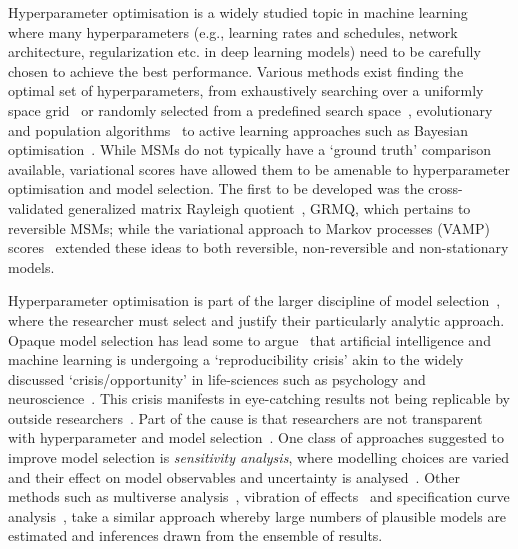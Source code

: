 \documentclass[journal=jacsat,manuscript=article]{achemso}
\begin{document}
Hyperparameter optimisation is a widely studied topic in machine learning~\cite{feurer2019hyperparameter, bergstra_jamesbergstra_random_2012, bergstra_making_2013, bergstraAlgorithmsHyperParameterOptimizationa} where many hyperparameters (e.g., learning rates and schedules, network architecture, regularization etc. in deep learning models) need to be carefully chosen to achieve the best performance. Various methods exist finding the optimal set of hyperparameters, from exhaustively searching over a uniformly space grid~\cite{c1997montgomery} or randomly selected from a predefined search space~\cite{bergstra_jamesbergstra_random_2012}, evolutionary and population algorithms~\cite{simon2013evolutionary, kennedyParticleSwarmOptimization1995, eberhart1998comparison, hansenCMAEvolutionStrategy2016} to active learning approaches such as Bayesian optimisation~\cite{hutterSequentialModelbasedOptimization2011, bergstraAlgorithmsHyperParameterOptimizationa, NIPS2012_4522, bergstraMakingScienceModel2013}.
While MSMs do not typically have a `ground truth' comparison available, variational scores have allowed them to be amenable to hyperparameter optimisation and model selection. The first to be developed was the cross-validated generalized matrix Rayleigh quotient~\cite{mcgibbonVariationalCrossvalidationSlow2015}, GRMQ, which pertains to reversible MSMs; while the variational approach to Markov processes (VAMP) scores~\cite{wuVariationalApproachLearning2020c,scherer_variational_2019} extended these ideas to both reversible, non-reversible and non-stationary models. 

Hyperparameter optimisation is part of the larger discipline of model selection~\cite{mcgibbon_statistical_2014, buckland_model_2019, navarro_between_2018, zucchini_introduction_2000, ding_model_2018},  where the researcher must select and justify their particularly analytic approach. Opaque model selection has lead some to argue~\cite{hutson_artificial_2018} that artificial intelligence and machine learning is undergoing a `reproducibility crisis' akin to the widely discussed `crisis/opportunity' in life-sciences such as psychology and neuroscience~\cite{munafo_reproducibility_2022}. This crisis manifests in eye-catching results not being replicable by outside researchers~\cite{munafo_research_2020}. Part of the cause is that researchers are not transparent with hyperparameter and model selection~\cite{munafo_manifesto_2017}. 
One class of approaches  suggested to improve model selection  is \emph{sensitivity analysis}, where modelling choices are varied and their effect on model observables and uncertainty is analysed~\cite{saltelli_global_2008}. Other methods such as multiverse analysis~\cite{steegen_increasing_2016}, vibration of effects~\cite{patel_assessment_2015} and specification curve analysis~\cite{simonsohn_specification_2020}, take a similar approach whereby large numbers of plausible models are estimated and inferences drawn from the ensemble of results. 
\end{document}
